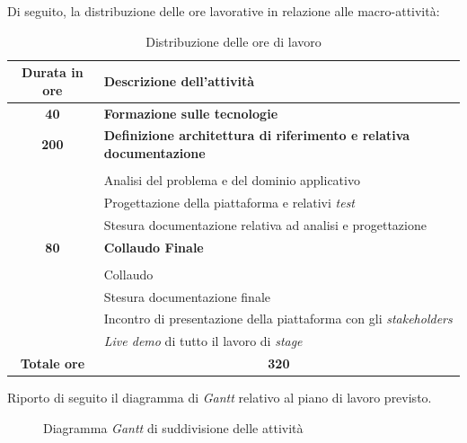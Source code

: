 Di seguito, la distribuzione delle ore lavorative in relazione alle macro-attività:
    \begin{table}[H]
        \begin{tabularx}{\textwidth}{|c|X|}
            \hline
            \textbf{Durata in ore} & \textbf{Descrizione dell'attività} \\ \hline
            
            \textbf{40} & \textbf{Formazione sulle tecnologie} \\	 
            \hline
            
            \textbf{200} & \textbf{Definizione architettura di riferimento e relativa documentazione} \\ \hdashline 
            \multirow{3}{0cm}\\ 
            & 
            {Analisi del problema e del dominio applicativo} \\
            & 
            {Progettazione della piattaforma e relativi \textit{test}} \\
            & 
            {Stesura documentazione relativa ad analisi e progettazione} \\
            \hline
            
            \textbf{80} & \textbf{Collaudo Finale}  \\ \hdashline 
            \multirow{4}{0cm}\\ 
            & 
            {Collaudo} \\
            & 
            {Stesura documentazione finale} \\
            & 
            {Incontro di presentazione della piattaforma con gli \textit{stakeholders}} \\
            & 
            {\textit{Live demo} di tutto il lavoro di \textit{stage}} \\
            \hline
            
            \textbf{Totale ore} & \multicolumn{1}{|c|}{\textbf{320}} \\ \hline
        \end{tabularx}
        \caption{Distribuzione delle ore di lavoro}
    \end{table}
    \vspace{0.5cm}
    Riporto di seguito il diagramma di \textit{Gantt} relativo al piano di lavoro previsto.
    \begin{figure}[H]
        \caption[Diagramma \textit{Gantt} di suddivisione delle attività]{Diagramma \textit{Gantt} di suddivisione delle attività}
    \end{figure}


